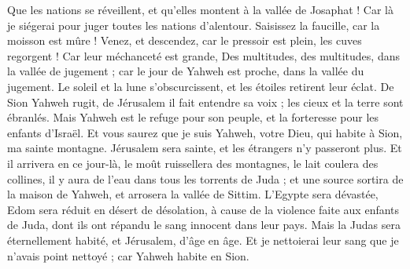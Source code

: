 \begin{multicols}{2}
Que les nations se réveillent, et qu'elles montent à la vallée de Josaphat ! Car là je siégerai pour juger toutes les nations d'alentour.
Saisissez la faucille, car la moisson est mûre ! Venez, et descendez, car le pressoir est plein, les cuves regorgent ! Car leur méchanceté est grande,
Des multitudes, des multitudes, dans la vallée de jugement ; car le jour de Yahweh est proche, dans la vallée du jugement.
Le soleil et la lune s’obscurcissent, et les étoiles retirent leur éclat.
De Sion Yahweh rugit, de Jérusalem il fait entendre sa voix ; les cieux et la terre sont ébranlés. Mais Yahweh est le refuge pour son peuple, et la forteresse pour les enfants d’Israël.
Et vous saurez que je suis Yahweh, votre Dieu, qui habite à Sion, ma sainte montagne. Jérusalem sera sainte, et les étrangers n'y passeront plus.
Et il arrivera en ce jour-là, le moût ruissellera des montagnes, le lait coulera des collines, il y aura de l’eau dans tous les torrents de Juda ; et une source sortira de la maison de Yahweh, et arrosera la vallée de Sittim.
L'Egypte sera dévastée, Edom sera réduit en désert de désolation, à cause de la violence faite aux enfants de Juda, dont ils ont répandu le sang innocent dans leur pays.
Mais la Judas sera éternellement habité, et Jérusalem, d’âge en âge.
Et je nettoierai leur sang que je n’avais point nettoyé ; car Yahweh habite en Sion.

\PPE{}
\end{multicols}
